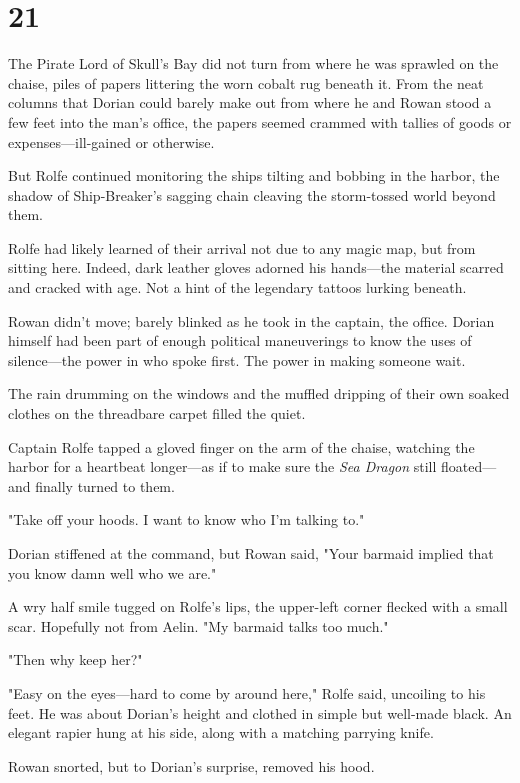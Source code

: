 
\chapter{21}

The Pirate Lord of Skull's Bay did not turn from where he was sprawled on the chaise, piles of papers littering the worn cobalt rug beneath it.
From the neat columns that Dorian could barely make out from where he and Rowan stood a few feet into the man's office, the papers seemed crammed with tallies of goods or expenses---ill-gained or otherwise.

But Rolfe continued monitoring the ships tilting and bobbing in the harbor, the shadow of Ship-Breaker's sagging chain cleaving the storm-tossed world beyond them.

Rolfe had likely learned of their arrival not due to any magic map, but from sitting here.
Indeed, dark leather gloves adorned his hands---the material scarred and cracked with age.
Not a hint of the legendary tattoos lurking beneath.

Rowan didn't move; barely blinked as he took in the captain, the office.
Dorian himself had been part of enough political maneuverings to know the uses of silence---the power in who spoke first.
The power in making someone wait.

The rain drumming on the windows and the muffled dripping of their own soaked clothes on the threadbare carpet filled the quiet.

Captain Rolfe tapped a gloved finger on the arm of the chaise, watching the harbor for a heartbeat longer---as if to make sure the \emph{Sea Dragon} still floated--- and finally turned to them.

"Take off your hoods.
I want to know who I'm talking to."

Dorian stiffened at the command, but Rowan said, "Your barmaid implied that you know damn well who we are."

A wry half smile tugged on Rolfe's lips, the upper-left corner flecked with a small scar.
Hopefully not from Aelin.
"My barmaid talks too much."

"Then why keep her?"

"Easy on the eyes---hard to come by around here," Rolfe said, uncoiling to his feet.
He was about Dorian's height and clothed in simple but well-made black.
An elegant rapier hung at his side, along with a matching parrying knife.

Rowan snorted, but to Dorian's surprise, removed his hood.


